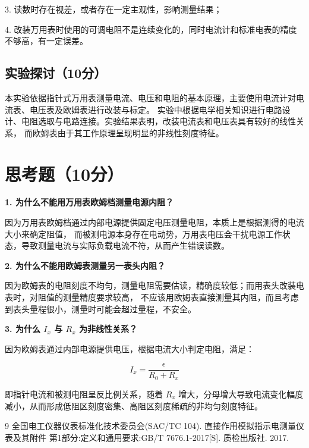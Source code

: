 \documentclass{Phyport}
\begin{document}
3. 读数时存在视差，或者存在一定主观性，影响测量结果；

4. 改装万用表时使用的可调电阻不是连续变化的，同时电流计和标准电表的精度不够高，有一定误差。

\subsection{实验探讨（10分）}

本实验依据指针式万用表测量电流、电压和电阻的基本原理，主要使用电流计对电流表、电压表及欧姆表进行改装与标定。
实验中根据电学相关知识进行电路设计、电阻选取与电路连接。实验结果表明，改装电流表和电压表具有较好的线性关系，
而欧姆表由于其工作原理呈现明显的非线性刻度特征。

\section{思考题（10分）}

\textbf{1. 为什么不能用万用表欧姆档测量电源内阻？}

因为万用表欧姆档通过内部电源提供固定电压测量电阻，本质上是根据测得的电流大小来确定阻值，
而被测电源本身存在电动势，万用表电压会干扰电源工作状态，导致测量电流与实际负载电流不符，从而产生错误读数。

\textbf{2. 为什么不能用欧姆表测量另一表头内阻？}

因为欧姆表的电阻刻度不均匀，测量电阻需要估读，精确度较低；而用表头改装电表时，对阻值的测量精度要求较高，
不应该用欧姆表直接测量其内阻，而且考虑到表头量程很小，测量时可能会超过量程，不安全。

\textbf{3. 为什么 $I_x$ 与 $R_x$ 为非线性关系？}

因为欧姆表通过内部电源提供电压，根据电流大小判定电阻，满足：

\[
I_x = \frac{\epsilon}{R_0 + R_x}
\]

即指针电流和被测电阻呈反比例关系，随着 $R_x$ 增大，分母增大导致电流变化幅度减小，从而形成低阻区刻度密集、高阻区刻度稀疏的非均匀刻度特征。

\begin{thebibliography}{9}
    全国电工仪器仪表标准化技术委员会(SAC/TC 104). 直接作用模拟指示电测量仪表及其附件  第1部分:定义和通用要求:GB/T 7676.1-2017[S]. 质检出版社. 2017. 

\end{thebibliography}


\end{document}
